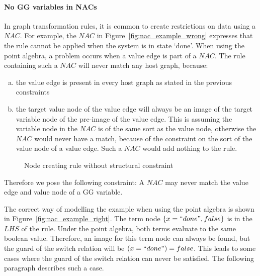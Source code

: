 \paragraph*{No GG variables in NACs}
In graph transformation rules, it is common to create restrictions on data using a $\mathit{NAC}$. For example, the $\mathit{NAC}$ in Figure~\ref{fig:nac_example_wrong} expresses that the rule cannot be applied when the system is in state `done'. When using the point algebra, a problem occurs when a value edge is part of a $\mathit{NAC}$. The rule containing such a $\mathit{NAC}$ will never match any host graph, because:
\begin{enumerate}[(a)]
\item the value edge is present in every host graph as stated in the previous constraints
\item the target value node of the value edge will always be an image of the target variable node of the pre-image of the value edge. This is assuming the variable node in the $\mathit{NAC}$ is of the same sort as the value node, otherwise the $\mathit{NAC}$ would never have a match, because of the constraint on the sort of the value node of a value edge. Such a $\mathit{NAC}$ would add nothing to the rule.
\end{enumerate}

\begin{figure}[ht]
  \begin{center}
  \end{center}
  \caption{Node creating rule without structural constraint}
  \label{fig:nac_example}
\end{figure}

Therefore we pose the following constraint: A $\mathit{NAC}$ may never match the value edge and value node of a GG variable. 

The correct way of modelling the example when using the point algebra is shown in Figure~\ref{fig:nac_example_right}. The term node $\{x = ``done", false\}$ is in the $\mathit{LHS}$ of the rule. Under the point algebra, both terms evaluate to the same boolean value. Therefore, an image for this term node can always be found, but the guard of the switch relation will be $(x = ``done") = false$. This leads to some cases where the guard of the switch relation can never be satisfied. The following paragraph describes such a case.

